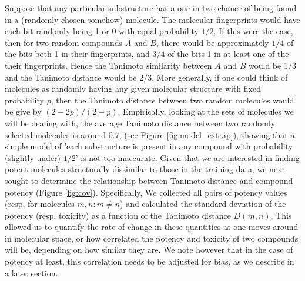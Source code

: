 \documentclass[journal=jacsat,manuscript=article]{achemso}
\begin{document}
Suppose that any particular substructure has a one-in-two chance of being found in a (randomly chosen somehow) molecule.  The molecular fingerprints would have each bit randomly being 1 or 0 with equal probability $1/2$.  If this were the case, then for two random compounds $A$ and $B$, there would be approximately $1/4$ of the bits both 1 in their fingerprints, and $3/4$ of the bits 1 in at least one of the their fingerprints.  Hence the Tanimoto similarity between $A$ and $B$ would be $1/3$ and the Tanimoto distance would be $2/3$.  More generally, if one could think of molecules as randomly having any given molecular structure with fixed probability $p$, then the Tanimoto distance between two random molecules would be give by $(2-2p)/(2 - p)$.
\newline
\newline
Empirically, looking at the sets of molecules we will be dealing with, the average Tanimoto distance between two randomly selected molecules is around $0.7$, (see Figure \ref{fig:model_extrap}), showing that a simple model of 'each substructure is present in any compound with probability (slightly under) $1/2$' is not too inaccurate.
\newline
\newline
Given that we are interested in finding potent molecules structurally dissimilar to those in the training data, we next sought to determine the relationship between Tanimoto distance and compound potency (Figure \ref{fig:cov}). Specifically, We collected all pairs of potency values (resp, for molecules $m, n: m \neq n$) and calculated the standard deviation of the potency (resp. toxicity) as a function of the Tanimoto distance $D(m, n)$. This allowed us to quantify the rate of change in these quantities as one moves around in molecular space, or how correlated the potency and toxicity of two compounds will be, depending on how similar they are. We note however that in the case of potency at least, this correlation needs to be adjusted for bias, as we describe in a later section.
\end{document}
